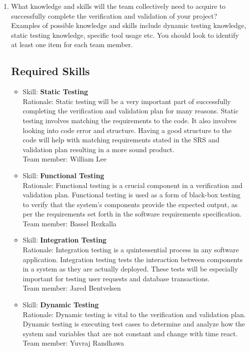 \documentclass[12pt, titlepage]{article}
\begin{document}
	\begin{enumerate}
		\item What knowledge and skills will the team collectively need to acquire to
		successfully complete the verification and validation of your project?
		Examples of possible knowledge and skills include dynamic testing knowledge,
		static testing knowledge, specific tool usage etc.  You should look to
		identify at least one item for each team member.
		\subsection{Required Skills}
		\begin{itemize}
			\item Skill: \textbf{Static Testing}
			\\ Rationale: Static testing will be a very important part of successfully completing the verification and validation plan for many reasons. Static testing involves matching the requirements to the code. It also involves looking into code error and structure. Having a good structure to the code will help with matching requirements stated in the SRS and validation plan resulting in a more sound product.
			\\ Team member: William Lee
			
			\item Skill: \textbf{Functional Testing}
			\\ Rationale: Functional testing is a crucial component in a verification and validation plan. Functional testing is used as a form of black-box testing to verify that the system's components provide the expected output, as per the requirements set forth in the software requirements specification.
			\\ Team member: Bassel Rezkalla

			\item Skill: \textbf{Integration Testing}
			\\ Rationale: Integration testing is a quintessential process in any software application. Integration testing tests the interaction between components in a system as they are actually deployed. These tests will be especially important for testing user requests and database transactions.
			\\ Team member: Jared Bentvelsen
      
			\item Skill: \textbf{Dynamic Testing}
			\\ Rationale: Dynamic testing is vital to the verification and validation plan. Dynamic testing is executing test cases to determine and analyze how the system and variables that are not constant and change with time react.
			\\ Team member: Yuvraj Randhawa


\end{itemize}
\end{enumerate}
\end{document}
